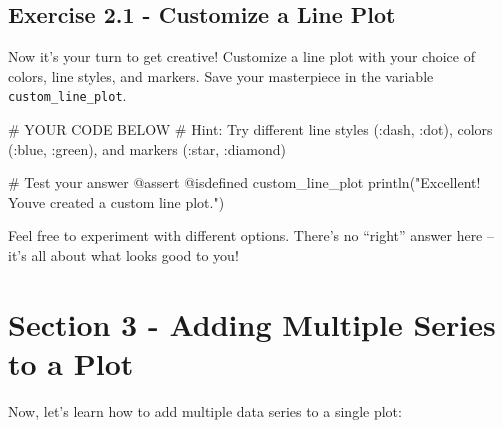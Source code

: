 \documentclass[
]{report}
\newenvironment{Shaded}{\begin{snugshade}}{\end{snugshade}}
\newcommand{\CommentTok}[1]{\textcolor[rgb]{0.37,0.37,0.37}{#1}}
\newcommand{\FunctionTok}[1]{\textcolor[rgb]{0.28,0.35,0.67}{#1}}
\newcommand{\NormalTok}[1]{\textcolor[rgb]{0.00,0.23,0.31}{#1}}
\newcommand{\PreprocessorTok}[1]{\textcolor[rgb]{0.68,0.00,0.00}{#1}}
\newcommand{\StringTok}[1]{\textcolor[rgb]{0.13,0.47,0.30}{#1}}
\begin{document}
\section{Exercise 2.1 - Customize a Line
Plot}\label{exercise-2.1---customize-a-line-plot}

Now it's your turn to get creative! Customize a line plot with your
choice of colors, line styles, and markers. Save your masterpiece in the
variable \texttt{custom\_line\_plot}.

\begin{Shaded}
\begin{Highlighting}[]
\CommentTok{\# YOUR CODE BELOW}
\CommentTok{\# Hint: Try different line styles (:dash, :dot), colors (:blue, :green), and markers (:star, :diamond)}
\end{Highlighting}
\end{Shaded}

\begin{Shaded}
\begin{Highlighting}[]
\CommentTok{\# Test your answer}
\PreprocessorTok{@assert} \PreprocessorTok{@isdefined}\NormalTok{ custom\_line\_plot}
\FunctionTok{println}\NormalTok{(}\StringTok{"Excellent! You\textquotesingle{}ve created a custom line plot."}\NormalTok{)}
\end{Highlighting}
\end{Shaded}

\begin{tcolorbox}[enhanced jigsaw, colback=white, left=2mm, title=\textcolor{quarto-callout-note-color}{\faInfo}\hspace{0.5em}{Note}, toprule=.15mm, opacitybacktitle=0.6, bottomtitle=1mm, leftrule=.75mm, coltitle=black, breakable, toptitle=1mm, opacityback=0, arc=.35mm, colbacktitle=quarto-callout-note-color!10!white, colframe=quarto-callout-note-color-frame, rightrule=.15mm, bottomrule=.15mm, titlerule=0mm]

Feel free to experiment with different options. There's no ``right''
answer here -- it's all about what looks good to you!

\end{tcolorbox}

\chapter{Section 3 - Adding Multiple Series to a
Plot}\label{section-3---adding-multiple-series-to-a-plot}

Now, let's learn how to add multiple data series to a single plot:
\end{document}
